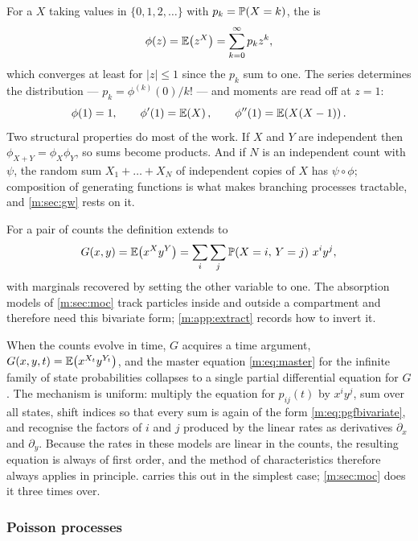 For a \rv{} $X$ taking values in $\{0,1,2,\dots\}$ with $p_k = \mathbb{P}\!\left(X=k\right)$, the
\pgf{} is
\begin{equation}
\label{m:eq:pgfdef}
\phi(z) = \mathbb{E}\!\left(z^X\right) = \sum_{k=0}^{\infty}p_k z^k ,
\end{equation}
which converges at least for $|z|\le1$ since the $p_k$ sum to one. The series
determines the distribution --- $p_k = \phi^{(k)}(0)/k!$ --- and moments are read
off at $z=1$:
\begin{equation}
\label{m:eq:pgfmoments}
\phi(1) = 1,
\qquad
\phi'(1) = \mathbb{E}\!\left(X\right),
\qquad
\phi''(1) = \mathbb{E}\!\left(X(X-1)\right) .
\end{equation}
Two structural properties do most of the work. If $X$ and $Y$ are independent then
$\phi_{X+Y} = \phi_X\phi_Y$, so sums become products. And if $N$ is an independent
count with \pgf{} $\psi$, the random sum $X_1+\dots+X_N$ of independent copies of
$X$ has \pgf{} $\psi\circ\phi$; composition of generating functions is what makes
branching processes tractable, and \cref{m:sec:gw} rests on it.

For a pair of counts the definition extends to
\begin{equation}
\label{m:eq:pgfbivariate}
G(x,y) = \mathbb{E}\!\left(x^{X}y^{Y}\right) = \sum_{i}\sum_{j}\mathbb{P}\!\left(X=i,\,Y=j\right)\,x^iy^j ,
\end{equation}
with marginals recovered by setting the other variable to one. The absorption
models of \cref{m:sec:moc} track particles inside and outside a compartment and
therefore need this bivariate form; \cref{m:app:extract} records how to invert it.

When the counts evolve in time, $G$ acquires a time argument,
$G(x,y,t) = \mathbb{E}\!\left(x^{X_t}y^{Y_t}\right)$, and the master equation \cref{m:eq:master} for the
infinite family of state probabilities collapses to a single partial differential
equation for $G$. The mechanism is uniform: multiply the equation for
$p_{ij}(t)$ by $x^iy^j$, sum over all states, shift indices so that every sum is
again of the form \cref{m:eq:pgfbivariate}, and recognise the factors of $i$ and $j$
produced by the linear rates as derivatives $\partial_x$ and $\partial_y$. Because
the rates in these models are linear in the counts, the resulting equation is
always of first order, and the method of characteristics therefore always applies
in principle.  carries this out in the simplest case;
\cref{m:sec:moc} does it three times over.


\subsubsection{Poisson processes}
\label{m:sec:poisson}

